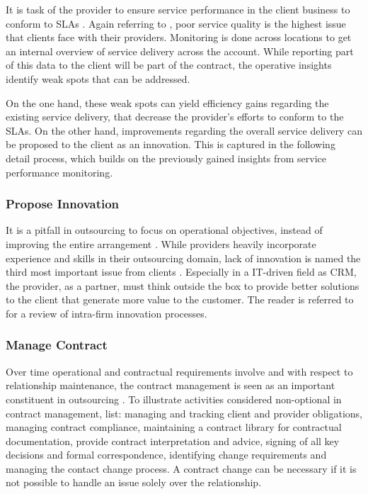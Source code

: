 	It is task of the provider to ensure service performance in the client business to conform to \acrshort{SLA}s \citep{deloittehandbook}. Again referring to \cite{deloitte2014outsourcing}, poor service quality is the highest issue that clients face with their providers. Monitoring is done across locations to get an internal overview of service delivery across the account. While reporting part of this data to the client will be part of the contract, the operative insights identify weak spots that can be addressed. 
	
	On the one hand, these weak spots can yield efficiency gains regarding the existing service delivery, that decrease the provider's efforts to conform to the \acrshort{SLA}s. On the other hand, improvements regarding the overall service delivery can be proposed to the client as an innovation. This is captured in the following detail process, which builds on the previously gained insights from service performance monitoring. 
	
	\subsubsection{Propose Innovation}
	
	It is a pitfall in outsourcing to focus on operational objectives, instead of improving the entire arrangement \citep{deloittehandbook}. While providers heavily incorporate experience and skills in their outsourcing domain, lack of innovation is named the third most important issue from clients \citep{deloitte2014outsourcing}. Especially in a IT-driven field as \acrshort{CRM}, the provider, as a partner, must think outside the box to provide better solutions to the client that generate more value to the customer. The reader is referred to \citep{Saren_1984} for a review of intra-firm innovation processes. 
	
	\subsubsection{Manage Contract}
	
	Over time operational and contractual requirements involve and with respect to relationship maintenance, the contract management is seen as an important constituent in outsourcing \citep{Franceschini_2003, perunovic2007outsourcing}. To illustrate activities considered non-optional in contract management, \citep[]{deloittehandbook} list: managing and tracking client and provider obligations, managing contract compliance, maintaining a contract library for contractual documentation, provide contract interpretation and advice, signing of all key decisions and formal correspondence, identifying change requirements and managing the contact change process. A contract change can be necessary if it is not possible to handle an issue solely over the relationship. 
	
